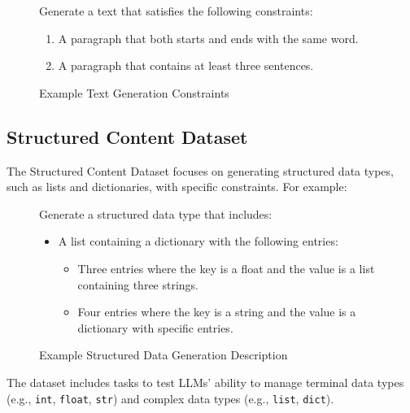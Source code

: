 \documentclass[10pt]{article} %
\begin{document}
    \begin{figure}[h]
        \centering
        \begin{tcolorbox}[colback=gray!20, colframe=black, width=\linewidth, sharp corners]
            Generate a text that satisfies the following constraints:
            \begin{enumerate}
                \item A paragraph that both starts and ends with the same word.
                \item A paragraph that contains at least three sentences.
            \end{enumerate}
        \end{tcolorbox}
        \caption{Example Text Generation Constraints}
        \label{fig:text_const_app}
    \end{figure}

    \subsection{Structured Content Dataset}
    \label{subsec:structured_dataset}
    The Structured Content Dataset focuses on generating structured data types, such as lists and dictionaries, with specific constraints. For example:

    \begin{figure}[h]
        \centering
        \begin{tcolorbox}[colback=gray!20, colframe=black, width=\linewidth, sharp corners]
            Generate a structured data type that includes:
            \begin{itemize}
                \item A list containing a dictionary with the following entries:
                \begin{itemize}
                    \item Three entries where the key is a float and the value is a list containing three strings.
                    \item Four entries where the key is a string and the value is a dictionary with specific entries.
                \end{itemize}
            \end{itemize}
        \end{tcolorbox}
        \caption{Example Structured Data Generation Description}
        \label{fig:data_structure}
    \end{figure}

    The dataset includes tasks to test LLMs' ability to manage terminal data types (e.g., \texttt{int}, \texttt{float}, \texttt{str}) and complex data types (e.g., \texttt{list}, \texttt{dict}).
\end{document}

